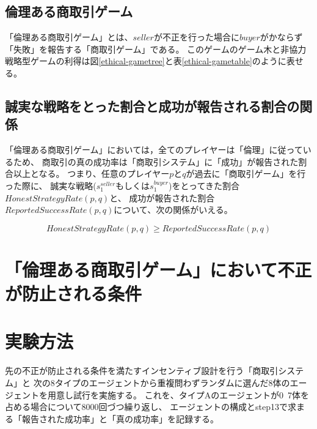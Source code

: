 \subsection{倫理ある商取引ゲーム}
「倫理ある商取引ゲーム」とは、$seller$が不正を行った場合に$buyer$がかならず「失敗」を報告する「商取引ゲーム」である。
このゲームのゲーム木と非協力戦略型ゲームの利得は図\ref{ethical-gametree}と表\ref{ethical-gametable}のように表せる。

\subsection{誠実な戦略をとった割合と成功が報告される割合の関係}
「倫理ある商取引ゲーム」においては，全てのプレイヤーは「倫理」に従っているため、
商取引の真の成功率は「商取引システム」に「成功」が報告された割合以上となる。
つまり、任意のプレイヤー$p$と$q$が過去に「商取引ゲーム」を行った際に、
誠実な戦略($s^{seller}_1$もしくは$s^{buyer}_1$)をとってきた割合$HonestStrategyRate(p, q)$と、
成功が報告された割合$ReportedSuccessRate(p, q)$について、次の関係がいえる。

\begin{equation}
  HonestStrategyRate(p, q) \geq ReportedSuccessRate(p, q)
\end{equation}

\section{「倫理ある商取引ゲーム」において不正が防止される条件}


\section{実験方法}
先の不正が防止される条件を満たすインセンティブ設計を行う「商取引システム」と
次の8タイプのエージェントから重複問わずランダムに選んだ8体のエージェントを用意し試行を実施する。
これを、タイプAのエージェントが0~7体を占める場合について8000回づつ繰り返し、
エージェントの構成とstep13で求まる「報告された成功率」と「真の成功率」を記録する。

